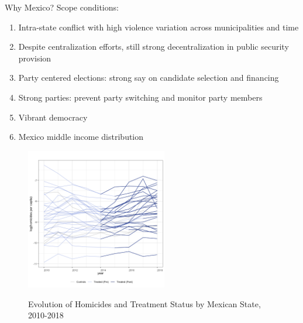 \documentclass{beamer}
\begin{document}
\begin{frame}[label=why_mexico, noframenumbering]{Why Mexico?}
Scope conditions:
\begin{enumerate}
 		  \setlength\itemsep{1em} 
	\item Intra-state conflict with high violence variation across municipalities and time \hyperlink{homicide_variation}{}

	\item Despite centralization efforts, still strong decentralization in public security provision
	\item Party centered elections: strong say on candidate selection and financing
	\item Strong parties: prevent party switching and monitor party members
	\item Vibrant democracy
	\item Mexico middle income distribution
\end{enumerate}
	\hyperlink{this_paper}{}
 
	
\end{frame}
\begin{frame}[label=homicide_variation, noframenumbering]

\begin{figure}[h] 
\centering
 \caption{Evolution of Homicides and Treatment Status by Mexican State, 2010-2018}
 \label{fig:homicides_evolution}
\includegraphics[width=0.55\textwidth]{Figures_pres/reform_treatment_defunciones.png}
       \captionsetup{justification=centering}
          
\hyperlink{why_mexico}{}
 
\end{figure}    

\end{frame} 
\end{document}

